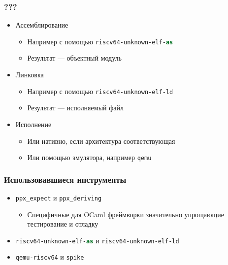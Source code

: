 \documentclass{beamer}
\begin{document}
\begin{frame}
	\frametitle{???}
	\begin{itemize}
		\item Ассемблирование
		\begin{itemize}
			\item Например с помощью \lstinline[language=ML]|riscv64-unknown-elf-as|
			\item Результат — объектный модуль
		\end{itemize}
		\item Линковка
			\begin{itemize}
				\item Например с помощью \lstinline[language=ML]|riscv64-unknown-elf-ld|
				\item Результат — исполняемый файл
			\end{itemize}
		\item Исполнение
		\begin{itemize}
			\item Или нативно, если архитектура соответствующая
			\item Или помощью эмулятора, например \lstinline[language=ML]|qemu|
		\end{itemize}
	\end{itemize}
\end{frame}

\begin{frame}
	\frametitle{Использовавшиеся инструменты}
		\begin{itemize}
			\item \lstinline[language=ML]|ppx_expect| и \lstinline[language=ML]|ppx_deriving|
			\begin{itemize}
				\item Специфичные для OCaml фреймворки значительно упрощающие тестирование и отладку
			\end{itemize}
			
			\item \lstinline[language=ML]|riscv64-unknown-elf-as| и \lstinline[language=ML]|riscv64-unknown-elf-ld|
			\item \lstinline[language=ML]|qemu-riscv64| и \lstinline[language=ML]|spike|
			
		\end{itemize}
\end{frame}
\end{document}
